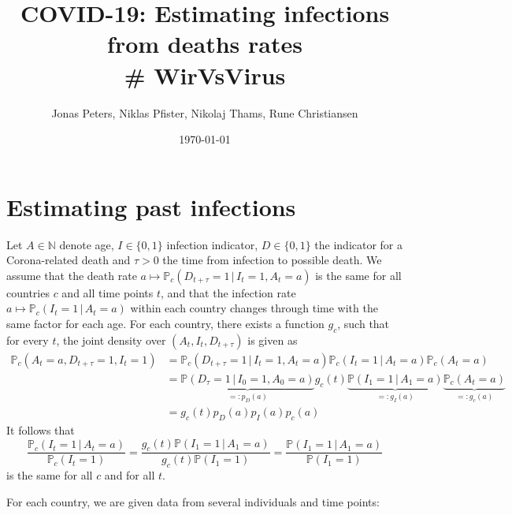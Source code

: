 \documentclass[a4paper]{article}
\title{COVID-19: Estimating infections from deaths rates \\ \# WirVsVirus}
\author{Jonas Peters, Niklas Pfister, Nikolaj Thams, Rune Christiansen}
\date{\today}
\newcommand\N{\mathbb{N}}
\renewcommand\P{\mathbb{P}}
\newcommand{\given}{\, \vert \,}
\begin{document}
\maketitle

\section{Estimating past infections}

Let $A \in \N$ denote age, $I \in \{0,1\}$ infection indicator, $D \in \{0,1\}$ the indicator for a Corona-related death and $\tau > 0$
the time from infection to possible death. We assume that the death rate $a \mapsto \P_c(D_{t+\tau} = 1 \given I_t = 1, A_t = a)$ is 
the same for all countries $c$ and all time points $t$, and that the infection rate $a \mapsto \P_c(I_{t} = 1 \given A_t = a)$ within 
each country changes through time with the same factor for each age. For each country, there exists a function $g_c$, such that for every $t$, the joint
density over $(A_t,I_t,D_{t+\tau})$ is given as
%
\begin{align*}
\P_c(A_t = a, D_{t+\tau} = 1, I_t = 1)	&= \P_c(D_{t+\tau} = 1 \given I_t = 1, A_t = a)  \P_c(I_t = 1 \given A_t = a) \P_c(A_t = a) \\
															&= \underbrace{\P(D_{\tau} = 1 \given I_0 = 1, A_0 = a)}_{=:p_D(a)} g_c(t) \underbrace{\P(I_1 = 1 \given A_1 = a)}_{=:g_I(a)} \underbrace{\P_c(A_t = a)}_{=:g_c(a)} \\
															&=  g_c(t) p_D(a) p_I(a) p_c(a)
\end{align*}
%
It follows that 
$$
\frac{\P_c(I_t = 1 \given A_t = a)}{\P_c(I_t = 1)} = \frac{g_c(t) \P(I_1 = 1 \given A_1 = a)}{g_c(t) \P(I_1 = 1)} = \frac{\P(I_1 = 1 \given A_1 = a)}{ \P(I_1 = 1)}
$$
is the same for all $c$ and for all $t$. 


For each country, we are given data from several individuals and time points:
\end{document}
